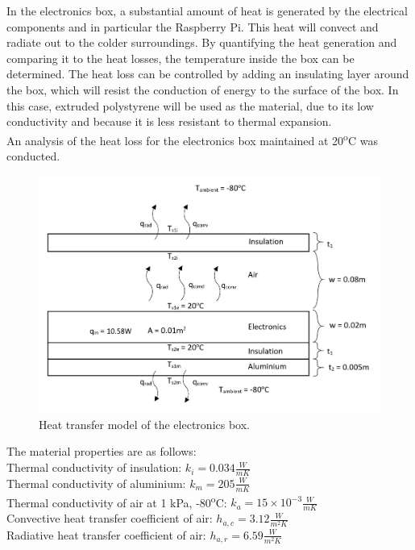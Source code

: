 In the electronics box, a substantial amount of heat is generated by the electrical components and in particular the Raspberry Pi. This heat will convect and radiate out to the colder surroundings. By quantifying the heat generation and comparing it to the heat losses, the temperature inside the box can be determined. The heat loss can be controlled by adding an insulating layer around the box, which will resist the conduction of energy to the surface of the box. In this case, extruded polystyrene will be used as the material, due to its low conductivity and because it is less resistant to thermal expansion. \\

An analysis of the heat loss for the electronics box maintained at 20\textsuperscript{o}C was conducted. \\

	\begin{figure}[H]
    \centering
    \includegraphics[scale=0.6]{4-experiment-design/img/mechanical/thermaldiagram.JPG}
	\caption{Heat transfer model of the electronics box.}
	\label{fig:thermaldiagram}
	\end{figure}

The material properties are as follows: \\

Thermal conductivity of insulation: $ k_{i} = 0.034 \frac{W}{m K} $ \\
Thermal conductivity of aluminium: $ k_{m} = 205 \frac{W}{m K} $ \\
Thermal conductivity of air at 1 kPa, -80\textsuperscript{o}C: $ k_{a} = 15\times10^{-3} \frac{W}{m K} $ \\ 
Convective heat transfer coefficient of air: $ h_{a,c} = 3.12 \frac{W}{m^{2} K} $ \\ 
Radiative heat transfer coefficient of air: $ h_{a,r} = 6.59 \frac{W}{m^{2} K} $ \\ 

